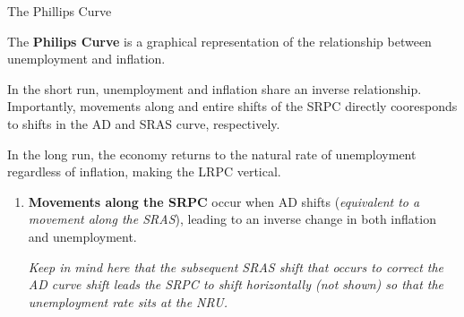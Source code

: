 \documentclass[10pt]{article}
\begin{document}
    \begin{core}{The Phillips Curve}

      The \textbf{Philips Curve} is a graphical representation of the relationship between unemployment and inflation.


      In the short run, unemployment and inflation share an inverse relationship. Importantly, movements along and entire shifts of the SRPC directly cooresponds to shifts in the AD and SRAS curve, respectively.

      In the long run, the economy returns to the natural rate of unemployment regardless of inflation, making the LRPC vertical.

      \begin{enumerate}

        \item \textbf{Movements along the SRPC} occur when AD shifts (\textit{equivalent to a movement along the SRAS}), leading to an inverse change in both inflation and unemployment.

        \textit{Keep in mind here that the subsequent SRAS shift that occurs to correct the AD curve shift leads the SRPC to shift horizontally (not shown) so that the unemployment rate sits at the NRU.}

\end{enumerate}
\end{core}
\end{document}

